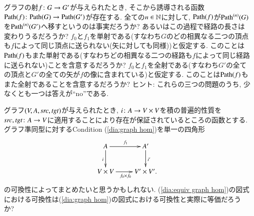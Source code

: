 \begin{exercise}
グラフの射$f\colon G\rightarrow G'$が与えられたとき, そこから誘導される函数$\Path(f)\taking\Path(G)\to\Path(G')$が存在する. 
\sexc 全ての$n\in{\mathbb N}$に対して, $\Path(f)$が$\Path^{(n)}(G)$を$\Path^{(n)}(G')$へ移すというのは事実だろうか? あるいはこの過程で経路の長さは変わりうるだろうか?
\next $f_0$と$f_1$を単射である(すなわち$G$のどの相異なる二つの頂点も$f$によって同じ頂点に送られない(矢に対しても同様))と仮定する. このことは$\Path(f)$もまた単射である(すなわちどの相異なる二つの経路も$f$によって同じ経路に送られない)ことを含意するだろうか?
\next $f_0$と$f_1$を全射である(すなわち$G'$の全ての頂点と$G'$の全ての矢が$f$の像に含まれている)と仮定する. このことは$\Path(f)$もまた全射であることを含意するだろうか? ヒント: これらの三つの問題のうち, 少なくとも一つは答えが``no''である.
\endsexc
\end{exercise}

\begin{exercise}\label{exc:single condition for graph hom}
グラフ$(V,A,\operatorname{\mathit{src}},\operatorname{\mathit{tgt}})$が与えられたとき, $i\colon A\rightarrow V\times V$を積の普遍的性質を$\operatorname{\mathit{src}},\operatorname{\mathit{tgt}}\colon A\rightarrow V$に適用することにより存在が保証されているところの函数とする. グラフ準同型に対するCondition (\ref{dia:graph hom})を単一の四角形
\begin{align}\label{dia:equiv graph hom}
\xymatrix{A\ar[r]^{f_1}\ar[d]_{i}&A'\ar[d]^{i'}\\V\times V\ar[r]_{f_0\times f_0}&V'\times V'.}
\end{align}
の可換性によってまとめたいと思うかもしれない. (\ref{dia:equiv graph hom})の図式における可換性は(\ref{dia:graph hom})の図式における可換性と実際に等価だろうか?
\end{exercise}

